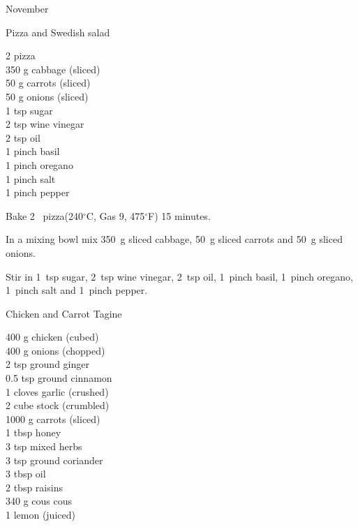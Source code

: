 \begin{menu}{November}
    \begin{recipe}{1}{Pizza and Swedish salad}%
		\begin{ingredients}
		2  pizza  \\
	350 g cabbage (sliced) \\
	50 g carrots (sliced) \\
	50 g onions (sliced) \\
	1 tsp sugar  \\
	2 tsp wine vinegar  \\
	2 tsp oil  \\
	1 pinch basil  \\
	1 pinch oregano  \\
	1 pinch salt  \\
	1 pinch pepper  \\
	
		\end{ingredients}
	
	
	
    \begin{instructions}
    \item 
        Bake 2~  pizza(240$^{\circ}$C, Gas 9, 475$^{\circ}$F) 15 minutes.
      \item 
        In a mixing bowl mix
        350~g sliced cabbage,
        50~g sliced carrots
        and
        50~g sliced onions.
      \item 
        Stir in
        1~tsp  sugar,
        2~tsp  wine vinegar,
        2~tsp  oil,
        1~pinch  basil,
        1~pinch  oregano,
        1~pinch  salt
        and
        1~pinch  pepper.
      
    \end{instructions}
    \end{recipe}%
  
    \begin{recipe}{2}{Chicken and Carrot Tagine}%
		\begin{ingredients}
		400 g chicken (cubed) \\
	400 g onions (chopped) \\
	2 tsp ground ginger  \\
	0.5 tsp ground cinnamon  \\
	1 cloves garlic (crushed) \\
	2 cube stock (crumbled) \\
	1000 g carrots (sliced) \\
	1 tbsp honey  \\
	3 tsp mixed herbs  \\
	3 tsp ground coriander  \\
	3 tbsp oil  \\
	2 tbsp raisins  \\
	340 g cous cous  \\
	1  lemon (juiced) \\
	

\end{ingredients}
\end{recipe}
\end{menu}
